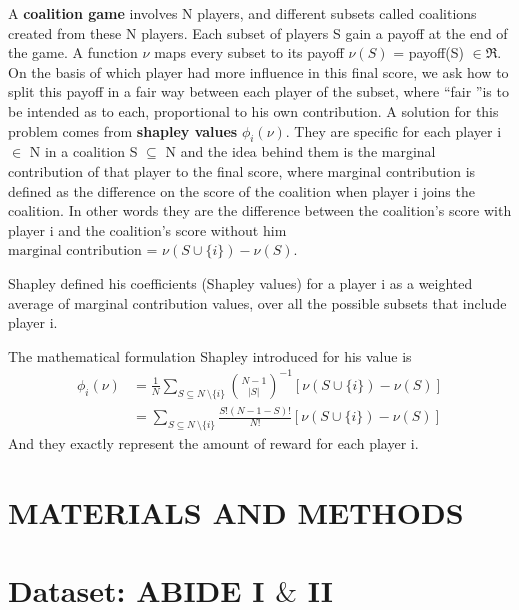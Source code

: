 \documentclass[11pt]{report}
\begin{document}
A \textbf{coalition game} involves N players, and different subsets called coalitions created from these N players.
Each subset of players S gain a payoff at the end of the game.
A function $\nu$ maps every subset to its payoff $\nu(S)$ = payoff(S) $\in \Re$.
On the basis of which player had more influence in this final score, we ask how to split this payoff in a fair way between each player of the subset, where \textquotedblleft fair \textquotedblright is to be intended as to each, proportional to his own contribution.
A solution for this problem comes from \textbf{shapley values} $\phi_i(\nu)$.
They are specific for each player i $\in$ N in a coalition S $\subseteq$ N and the idea behind them is the marginal contribution of that player to the final score, where marginal contribution is defined as the difference on the score of the coalition when player i joins the coalition.
In other words they are the difference between the coalition's score with player i and the coalition's score without him $\text{marginal contribution = }\nu (S \cup \{ i \}) - \nu(S)$. \cite{algaba-2021}

Shapley defined his coefficients (Shapley values) for a player i as a weighted average of marginal contribution values, over all the possible subsets that include player i.

The mathematical formulation Shapley introduced for his value is
\begin{equation}
\begin{aligned}
\phi_i(\nu)  & = \frac{1}{N }\sum_{S\subseteq N\ \setminus \{ i \} }  {N- 1 \choose |S|}^{-1} [\nu (S \cup \{ i \}) - \nu(S)] \\
& = \sum_{S\subseteq N\ \setminus \{ i \} }  \frac{S! (N-1-S)!}{N!} [\nu (S \cup \{ i \}) - \nu(S) ]
\end{aligned}
\end{equation}
And they exactly represent the amount of reward for each player i.



\chapter*{MATERIALS AND METHODS}

\chapter{Dataset: ABIDE I $\&$ II}\label{chap:dataset}
\end{document}
